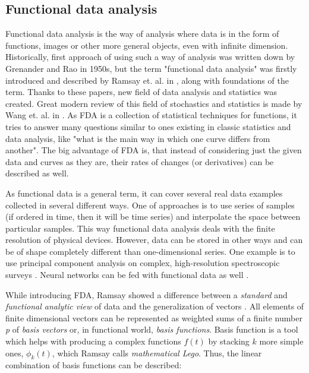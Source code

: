 \documentclass[energies,article,submit,pdftex,moreauthors]{Definitions/mdpi}
\begin{document}
\subsection{Functional data analysis}
Functional data analysis is the way of analysis where data is in the form of functions, images or other more general objects, even with infinite dimension. Historically, first approach of using such a way of analysis was written down by Grenander \cite{grenander1950stochastic} and Rao \cite{rao1958some} in 1950s, but the term "functional data analysis" was firstly introduced and described by Ramsay et. al. in \cite{ramsay-logreg, ramsay-logreg2, ramsay1982data}, along with foundations of the term. Thanks to these papers, new field of data analysis and statistics was created. Great modern review of this field of stochastics and statistics is made by Wang et. al. in \cite{wang2016functional}. As FDA is a collection of statistical techniques for functions, it tries to answer many questions similar to ones existing in classic statistics and data analysis, like "what is the main way in which one curve differs from another". The big advantage of FDA is, that instead of considering just the given data and curves as they are, their rates of changes (or derivatives) can be described as well.

As functional data is a general term, it can cover several real data examples collected in several different ways. One of approaches is to use series of samples (if ordered in time, then it will be time series) and interpolate the space between particular samples. This way functional data analysis deals with the finite resolution of physical devices. However, data can be stored in other ways and can be of shape completely different than one-dimensional series. One example is to use principal component analysis on complex, high-resolution spectroscopic surveys \cite{Patil_2022}. Neural networks can be fed with functional data as well \cite{rossi2005representation}.

While introducing FDA, Ramsay showed a difference between a \emph{standard} and \emph{functional analytic view} of data and the generalization of vectors \cite{ramsay1982data}. All elements of finite dimensional vectors can be represented as weighted sums of a finite number \emph{p} of \emph{basis vectors} or, in functional world, \emph{basis functions}. Basis function is a tool which helps with producing a complex functions $ f(t) $ by stacking $ k $ more simple ones, $ \phi_k(t) $, which Ramsay calls \emph{mathematical Lego}. Thus, the linear combination of basis functions can be described:
\end{document}
